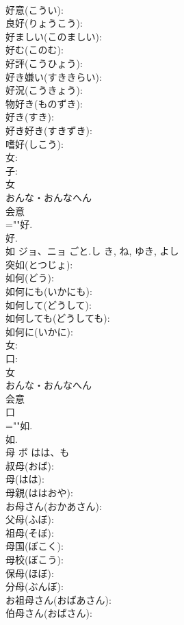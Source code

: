 \documentclass[8pt]{extreport}
\begin{document}
\begin{CJK}{UTF8}{min}
\\	好意(こうい): 
\\	良好(りょうこう): 
\\	好ましい(このましい): 
\\	好む(このむ): 
\\	好評(こうひょう): 
\\	好き嫌い(すききらい): 
\\	好況(こうきょう): 
\\	物好き(ものずき): 
\\	好き(すき): 
\\	好き好き(すきずき): 
\\	嗜好(しこう): 
\\	女: 
\\	子: 
\\	女	
\\	おんな・おんなへん	
\\	会意 
\\	=""好.
\\	好.
\\	如	ジョ、ニョ	ごと.し	き, ね, ゆき, よし	
\\	突如(とつじょ): 
\\	如何(どう): 
\\	如何にも(いかにも): 
\\	如何して(どうして): 
\\	如何しても(どうしても): 
\\	如何に(いかに): 
\\	女: 
\\	口: 
\\	女	
\\	おんな・おんなへん	
\\	会意 
\\	口
\\	=""如.
\\	如.
\\	母	ボ	はは、も		
\\	叔母(おば): 
\\	母(はは): 
\\	母親(ははおや): 
\\	お母さん(おかあさん): 
\\	父母(ふぼ): 
\\	祖母(そぼ): 
\\	母国(ぼこく): 
\\	母校(ぼこう): 
\\	保母(ほぼ): 
\\	分母(ぶんぼ): 
\\	お祖母さん(おばあさん): 
\\	伯母さん(おばさん): 

\end{CJK}
\end{document}
